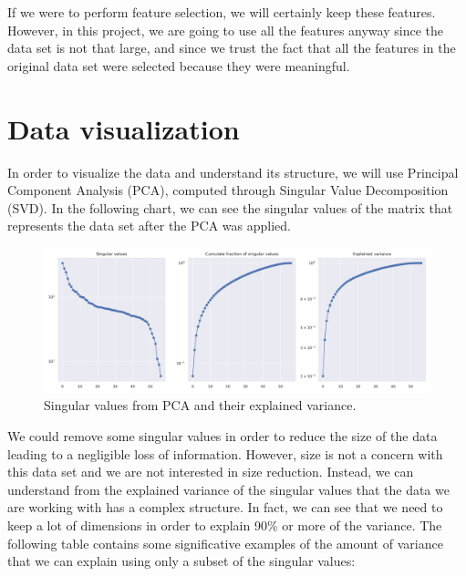 \documentclass{Configuration_Files/PoliMi3i_thesis}
\begin{document}
If we were to perform feature selection, we will certainly keep these features.  \\
However, in this project, we are going to use all the features anyway since the data set is not that large, and since we trust the fact that all the features in the original data set were selected because they were meaningful.

\section{Data visualization}
\label{sec:visualization}%
In order to visualize the data and understand its structure, we will use Principal Component Analysis (PCA), computed through Singular Value Decomposition (SVD). In the following chart, we can see the singular values of the matrix that represents the data set after the PCA was applied.

\begin{figure}[H]
    \centering
    \includegraphics[width=\textwidth]{Figures/singular_values.png}
    \caption{Singular values from PCA and their explained variance.}
    \label{fig:singular_values}
\end{figure}

We could remove some singular values in order to reduce the size of the data leading to a negligible loss of information. However, size is not a concern with this data set and we are not interested in size reduction. 
Instead, we can understand from the explained variance of the singular values that the data we are working with has a complex structure. In fact, we can see that we need to keep a lot of dimensions in order to explain 90\% or more of the variance. The following table contains some significative examples of the amount of variance that we can explain using only a subset of the singular values:
\end{document}
